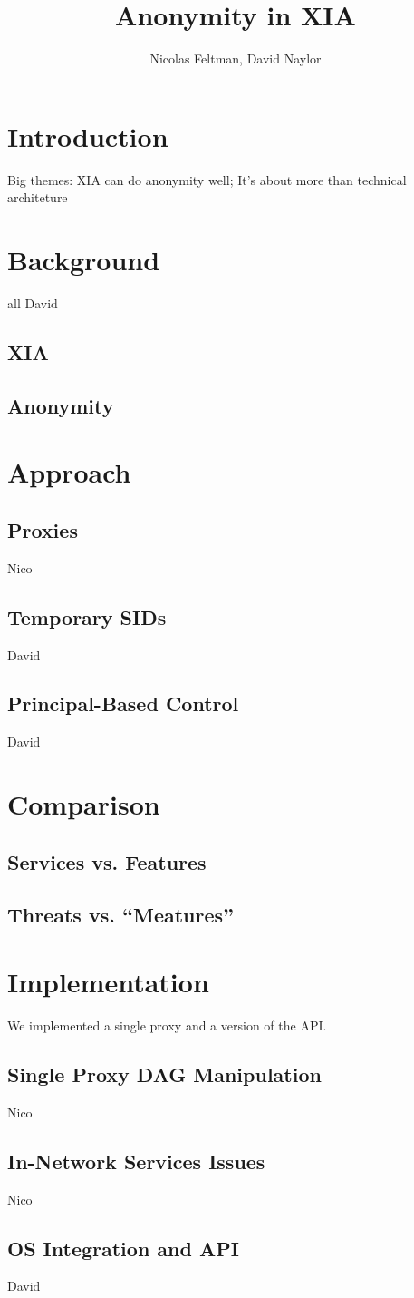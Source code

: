 \documentclass{article}
\title{Anonymity in XIA}
\author{Nicolas Feltman, David Naylor}
\begin{document}
\maketitle
\section{Introduction}
Big themes: XIA can do anonymity well;  It's about more than technical architeture
\section{Background}
all David
\subsection{XIA}
\subsection{Anonymity}
\section{Approach}
\subsection{Proxies}
Nico
\subsection{Temporary SIDs}
David
\subsection{Principal-Based Control}
David
\section{Comparison}
\subsection{Services vs. Features}
\subsection{Threats vs. ``Meatures''}
\section{Implementation}
We implemented a single proxy and a version of the API.
\subsection{Single Proxy DAG Manipulation}
Nico
\subsection{In-Network Services Issues}
Nico
\subsection{OS Integration and API}
David



\end{document}
